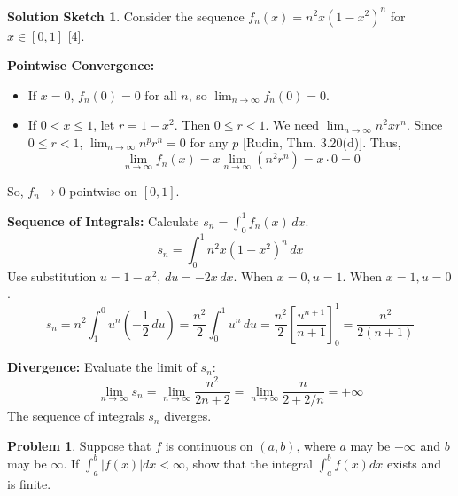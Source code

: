 \documentclass{article}
\theoremstyle{definition} %
\newtheorem{problem}{Problem}
\theoremstyle{definition} %
\newtheorem*{solution}{Solution Sketch}
\begin{document}
\begin{solution}
Consider the sequence $f_n(x) = n^2 x (1-x^2)^n$ for $x \in [0,1]$ [4].

\textbf{Pointwise Convergence:}
\begin{itemize}
    \item If $x=0$, $f_n(0) = 0$ for all $n$, so $\lim_{n\to\infty} f_n(0) = 0$.
    \item If $0 < x \le 1$, let $r = 1-x^2$. Then $0 \le r < 1$. We need $\lim_{n\to\infty} n^2 x r^n$. Since $0 \le r < 1$, $\lim_{n\to\infty} n^p r^n = 0$ for any $p$ [Rudin, Thm. 3.20(d)]. Thus,
    \[ \lim_{n\to\infty} f_n(x) = x \lim_{n\to\infty} (n^2 r^n) = x \cdot 0 = 0 \]
\end{itemize}
So, $f_n \to 0$ pointwise on $[0,1]$.

\textbf{Sequence of Integrals:} Calculate $s_n = \int_0^1 f_n(x) \, dx$.
\[ s_n = \int_0^1 n^2 x (1-x^2)^n \, dx \]
Use substitution $u = 1-x^2$, $du = -2x \, dx$. When $x=0, u=1$. When $x=1, u=0$.
\[ s_n = n^2 \int_1^0 u^n \left(-\frac{1}{2} \, du\right) = \frac{n^2}{2} \int_0^1 u^n \, du = \frac{n^2}{2} \left[ \frac{u^{n+1}}{n+1} \right]_0^1 = \frac{n^2}{2(n+1)} \]

\textbf{Divergence:} Evaluate the limit of $s_n$:
\[ \lim_{n\to\infty} s_n = \lim_{n\to\infty} \frac{n^2}{2n+2} = \lim_{n\to\infty} \frac{n}{2 + 2/n} = +\infty \]
The sequence of integrals $s_n$ diverges.
\end{solution}

\begin{problem}
Suppose that $f$ is continuous on $(a,b)$, where $a$ may be $-\infty$ and $b$ may be $\infty$. If $\int_a^b |f(x)|dx <\infty$, show that the integral $\int_a^b f(x) dx$ exists and is finite.
\end{problem}
\end{document}
